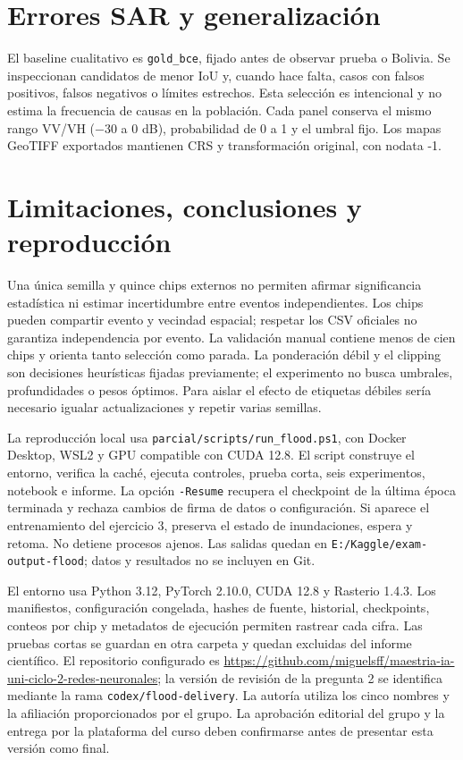 \section{Errores SAR y generalización}

El baseline cualitativo es \texttt{gold\_bce}, fijado antes de observar prueba o Bolivia.
Se inspeccionan candidatos de menor IoU y, cuando hace falta, casos con falsos positivos,
falsos negativos o límites estrechos. Esta selección es intencional y no estima la
frecuencia de causas en la población. Cada panel conserva el mismo rango VV/VH
($-30$ a 0 dB), probabilidad de 0 a 1 y el umbral fijo. Los mapas GeoTIFF exportados
mantienen CRS y transformación original, con nodata -1.

\section{Limitaciones, conclusiones y reproducción}

Una única semilla y quince chips externos no permiten afirmar significancia estadística
ni estimar incertidumbre entre eventos independientes. Los chips pueden compartir evento
y vecindad espacial; respetar los CSV oficiales no garantiza independencia por evento.
La validación manual contiene menos de cien chips y orienta tanto selección como parada.
La ponderación débil y el clipping son decisiones heurísticas fijadas previamente;
el experimento no busca umbrales, profundidades o pesos óptimos. Para aislar el efecto
de etiquetas débiles sería necesario igualar actualizaciones y repetir varias semillas.

La reproducción local usa \texttt{parcial/scripts/run\_flood.ps1}, con Docker Desktop,
WSL2 y GPU compatible con CUDA 12.8. El script construye el entorno, verifica la caché,
ejecuta controles, prueba corta, seis experimentos, notebook e informe. La opción
\texttt{-Resume} recupera el checkpoint de la última época terminada y rechaza cambios
de firma de datos o configuración. Si aparece el entrenamiento del ejercicio 3, preserva
el estado de inundaciones, espera y retoma. No detiene procesos ajenos. Las salidas quedan
en \texttt{E:/Kaggle/exam-output-flood}; datos y resultados no se incluyen en Git.

El entorno usa Python 3.12, PyTorch 2.10.0, CUDA 12.8 y Rasterio 1.4.3.
Los manifiestos, configuración congelada, hashes de fuente, historial, checkpoints,
conteos por chip y metadatos de ejecución permiten rastrear cada cifra. Las pruebas cortas
se guardan en otra carpeta y quedan excluidas del informe científico. El repositorio
configurado es \url{https://github.com/miguelsff/maestria-ia-uni-ciclo-2-redes-neuronales};
la versión de revisión de la pregunta 2 se identifica mediante la rama
\texttt{codex/flood-delivery}. La autoría utiliza los cinco nombres y la afiliación
proporcionados por el grupo. La aprobación editorial del grupo y la entrega por la
plataforma del curso deben confirmarse antes de presentar esta versión como final.



